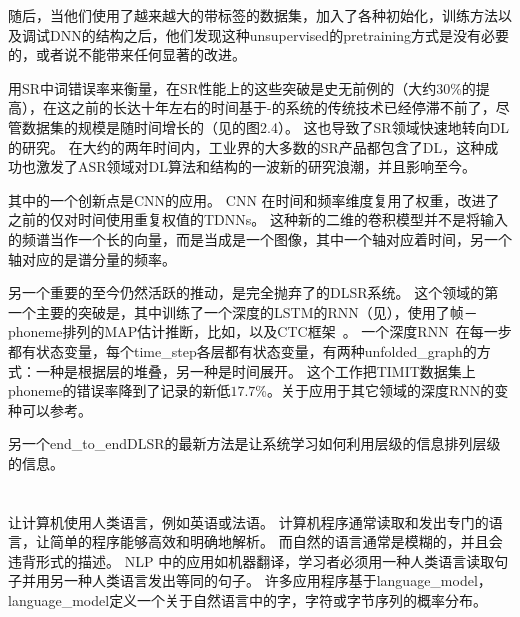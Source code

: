 随后，当他们使用了越来越大的带标签的数据集，加入了各种初始化，训练方法以及调试\gls{DNN}的结构之后，他们发现这种\gls{unsupervised}的\gls{pretraining}方式是没有必要的，或者说不能带来任何显著的改进。

用\gls{SR}中词错误率来衡量，在\gls{SR}性能上的这些突破是史无前例的（大约$30$\%的提高），在这之前的长达十年左右的时间基于-的系统的传统技术已经停滞不前了，尽管数据集的规模是随时间增长的（见\citet{Deng+Yu-2014}的图2.4）。
这也导致了\gls{SR}领域快速地转向\gls{DL}的研究。
在大约的两年时间内，工业界的大多数的\gls{SR}产品都包含了\gls{DL}，这种成功也激发了\gls{ASR}领域对\gls{DL}算法和结构的一波新的研究浪潮，并且影响至今。

其中的一个创新点是\gls{CNN}的应用\citep{Sainath-et-al-ICASSP2013}。
\gls{CNN} 在时间和频率维度复用了权重，改进了之前的仅对时间使用重复权值的\gls{TDNNs}。
这种新的二维的卷积模型并不是将输入的频谱当作一个长的向量，而是当成是一个图像，其中一个轴对应着时间，另一个轴对应的是谱分量的频率。

另一个重要的至今仍然活跃的推动，是完全抛弃了的\gls{DL}\gls{SR}系统。
这个领域的第一个主要的突破是\citet{Graves-et-al-ICASSP2013}，其中训练了一个深度的\gls{LSTM}的\gls{RNN}（见），使用了帧－\gls{phoneme}排列的\gls{MAP}估计推断，比如\citet{chapter-gradient-document-2001}，以及CTC框架~\citep{Graves-et-al-2006,Graves-book2012}。
一个深度\gls{RNN}~\citep{Graves-et-al-ICASSP2013}在每一步都有状态变量，每个\gls{time_step}各层都有状态变量，有两种\gls{unfolded_graph}的方式：一种是根据层的堆叠，另一种是时间展开。
这个工作把TIMIT数据集上\gls{phoneme}的错误率降到了记录的新低$17.7$\%。关于应用于其它领域的深度\gls{RNN}的变种可以参考\citet{Pascanu-et-al-ICLR2014,Chung-et-al-NIPSDL2014-small}。

另一个\gls{end_to_end}\gls{DL}\gls{SR}的最新方法是让系统学习如何利用层级的信息排列层级的信息\citep{Chorowski-et-al-arxiv2014,llu_is2015b}。


\section{}
\label{sec: natural_language_processing}

 让计算机使用人类语言，例如英语或法语。
计算机程序通常读取和发出专门的语言，让简单的程序能够高效和明确地解析。
而自然的语言通常是模糊的，并且会违背形式的描述。
\gls{NLP} 中的应用如机器翻译，学习者必须用一种人类语言读取句子并用另一种人类语言发出等同的句子。
许多应用程序基于\gls{language_model}，\gls{language_model}定义一个关于自然语言中的字，字符或字节序列的概率分布。

